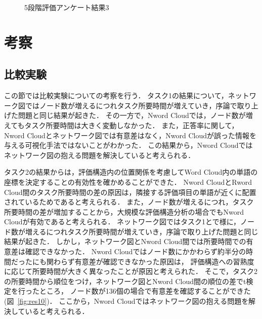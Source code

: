 \documentclass[syuuron]{kuee}
\begin{document}
		\begin{figure}
			\begin{center}
			\end{center}
			\caption{5段階評価アンケート結果3}
	  		\label{fig:res9}
		\end{figure}

			
\chapter{考察}
	\section{比較実験}
	この節では比較実験についての考察を行う．
	タスク1の結果について，ネットワーク図ではノード数が増えるにつれタスク所要時間が増えていき，序論で取り上げた問題と同じ結果が起きた．
	その一方で，Nword Cloudでは，ノード数が増えてもタスク所要時間は大きく変動しなかった．
	また，正答率に関して，Nword Cloudとネットワーク図では有意差はなく，Nword Cloudが誤った情報を与える可視化手法ではないことがわかった．
	この結果から，Nword Cloudではネットワーク図の抱える問題を解決していると考えられる．
	
	タスク2の結果からは，評価構造内の位置関係を考慮してWord Cloud内の単語の座標を決定することの有効性を確かめることができた．
	Nword CloudとRword Cloud間のタスク所要時間の差の原因は，隣接する評価項目の単語が近くに配置されているためであると考えられる．
	また，ノード数が増えるにつれ，タスク所要時間の差が増加することから，大規模な評価構造分析の場合でもNword Cloudが有効であると考えられる．
	ネットワーク図ではタスク1とで様に，ノード数が増えるにつれタスク所要時間が増えていき，序論で取り上げた問題と同じ結果が起きた．
	しかし，ネットワーク図とNword Cloud間では所要時間での有意差は確認できなかった．
	Nword Cloudではノード数にかかわらず約半分の時間だったにも関わらず有意差が確認できなかった原因は，
	評価構造への習熟度に応じて所要時間が大きく異なったことが原因と考えられた．
	そこで，タスク2の所要時間から順位をつけ，ネットワーク図とNword Cloud間の順位の差でt検定を行ったところ，
	ノード数が136個の場合で有意差を確認することができた(図~\ref{fig:res10})．
	ここから，Nword Cloudではネットワーク図の抱える問題を解決していると考えられる．
	
\end{document}
